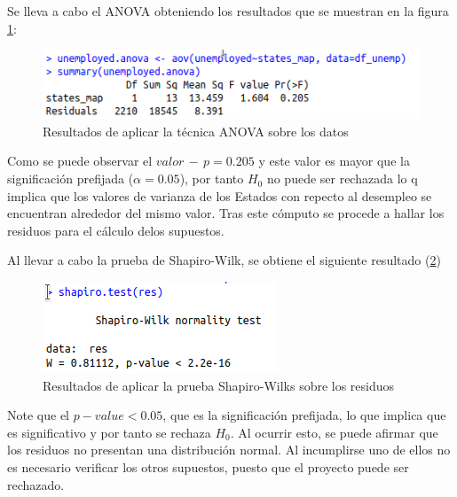 \documentclass[a4paper,10pt,twocolumn]{article}
\begin{document}
Se lleva a cabo el ANOVA obteniendo los resultados que se muestran en la figura \ref{fig:anova_unemp}:
\begin{figure}[htb]
	\begin{center}
		\includegraphics[width=\columnwidth]{figures/unemployed_anova.png}
	\end{center}
	\caption{Resultados de aplicar la técnica ANOVA sobre los datos \label{fig:anova_unemp}}
\end{figure}

Como se puede observar el $valor \, -\, p = 0.205$ y este valor es mayor que la significación prefijada ($\alpha = 0.05$), por tanto $H_0$ no puede ser rechazada lo q implica que los valores de varianza de los Estados con repecto al desempleo se encuentran alrededor del mismo valor. Tras este cómputo se procede a hallar los residuos para el cálculo delos supuestos.

Al llevar a cabo la prueba de Shapiro-Wilk, se obtiene el siguiente resultado (\ref{fig:shapiro_unemp})
\begin{figure}[htb]
	\begin{center}
		\includegraphics[width=\columnwidth]{figures/unemployed_shapiro.png}
	\end{center}
	\caption{Resultados de aplicar la prueba Shapiro-Wilks sobre los residuos \label{fig:shapiro_unemp}}
\end{figure}
Note que el $p-value < 0.05$, que es la significación prefijada, lo que implica que es significativo y por tanto se rechaza $H_0$. Al ocurrir esto, se puede afirmar que los residuos no presentan una distribución normal. Al incumplirse uno de ellos no es necesario verificar los otros supuestos, puesto que el proyecto puede ser rechazado.
\end{document}
